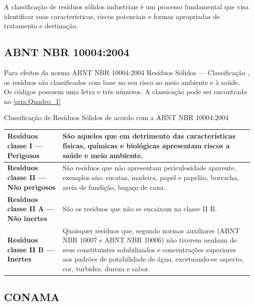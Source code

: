 A classificação de resíduos sólidos industriais é um processo fundamental que visa identificar suas características, riscos potenciais e formas apropriadas de tratamento e destinação. 

\subsection{ABNT NBR 10004:2004}

Para efeitos da norma ABNT NBR 10004:2004 Resíduos Sólidos — Classificação \cite{abnt_abnt_2004}, os resíduos são classificados com base no seu risco ao meio ambiente e à saúde. Os códigos possuem uma letra e três números. A classicação pode ser encontrada no \autoref{qua:Quadro_1}

\begin{quadro}[htb]
	\centering
	\caption{\label{qua:Quadro_1} Classificação de Resíduos Sólidos de acordo com a ABNT NBR 10004:2004}	
	\resizebox{\textwidth}{!}
	{\begin{tabular}{|l|p{11cm}|}
		\hline
		\textbf{Resíduos classe I — Perigosos} & São aqueles que em detrimento das características físicas, químicas e biológicas apresentam riscos a saúde e meio ambiente.  \\ \hline
		\textbf{Resíduos classe II — Não perigosos}        & São resíduos que não apresentam periculosidade aparente, exemplos são: sucatas, madeira, papel e papelão, borracha, areia de fundição, bagaço de cana.\\ \hline
		\textbf{Resíduos classe II A — Não inertes}          & São os resíduos que não se encaixam na classe II B. \\ \hline
		\textbf{Resíduos classe II B — Inertes}        & Quaisquer resíduos que, segundo normas auxiliares (ABNT NBR 10007 e ABNT NBR 10006) não tiverem nenhum de seus constituintes solubilizados e concentrações superiores aos padrões de potabilidade de água, excetuando-se aspecto, cor, turbidez, dureza e sabor. \\ \hline
	\end{tabular}}
\end{quadro}


\subsection{CONAMA}

